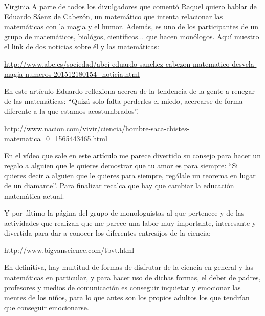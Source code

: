\begin{opin}{\virgicolor}{Virginia}
A parte de todos los divulgadores que comentó Raquel quiero hablar de Eduardo Sáenz de Cabezón, un matemático que intenta relacionar las matemáticas con la magia y el humor. Además, es uno de los participantes de un grupo de matemáticos, biológos, científicos... que hacen monólogos. Aquí muestro el link de dos noticias sobre él y las matemáticas:

\url{http://www.abc.es/sociedad/abci-eduardo-sanchez-cabezon-matematico-desvela-magia-numeros-201512180154_noticia.html}

En este artículo Eduardo reflexiona acerca de la tendencia de la gente a renegar de las matemáticas: “Quizá solo falta perderles el miedo, acercarse de forma diferente a la que estamos acostumbrados”.

\url{http://www.nacion.com/vivir/ciencia/hombre-saca-chistes-matematica_0_1565443465.html}

En el vídeo que sale en este artículo me parece divertido su consejo para hacer un regalo a alguien que le quieres demostrar que tu amor es para siempre: “Si quieres decir a alguien que le quieres para siempre, regálale un teorema en lugar de un diamante”. Para finalizar recalca que hay que cambiar la educación matemática actual.

Y por último la página del grupo de monologuistas al que pertenece y de las actividades que realizan que me parece una labor muy importante, interesante y divertida para dar a conocer los diferentes entresijos de la ciencia:

\url{http://www.bigvanscience.com/tbvt.html}

En definitiva, hay multitud de formas de disfrutar de la ciencia en general y las matemáticas en particular, y para hacer uso de dichas formas, el deber de padres, profesores y medios de comunicación es conseguir inquietar y emocionar las mentes de los niños, para lo que antes son los propios adultos los que tendrían que conseguir emocionarse.

\end{opin}
